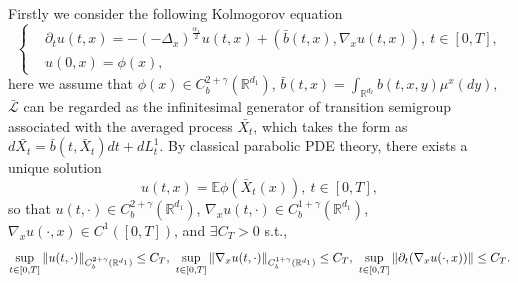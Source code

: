 \documentclass[11pt,reqno]{amsart}
\numberwithin{equation}{section}
\begin{document}
Firstly we consider the following Kolmogorov equation
\begin{equation}\label{6.10}
	\left\{
	\begin{aligned}
		&\partial_{t}u(t,x)=	-(-\Delta_{x})^{\frac{\alpha_{1}}{2}}u(t,x)+( \bar{b}(t,x),\nabla_{x}u(t,x)) ,\ t\in[0,T],\\
		&u(0,x)=\phi(x),
	\end{aligned}
	\right.
\end{equation}
here we assume that  $\phi(x)\in C^{2+\gamma}_{b}(\mathbb{R}^{d_{1}})$,  $ \bar{b}(t,x)=\int_{\mathbb{R}^{d_{2}}}b(t,x,y)\mu^{x}(dy),$ $\mathcal{\bar{L}}$ can be regarded as the infinitesimal generator of transition semigroup associated with the averaged process $\bar{X_{t}}$, which takes the form as $d\bar{X_{t}}=\bar{b}(t,\bar{X}_{t})dt+dL_{t}^{1}$. By classical parabolic PDE theory, there exists a unique solution 
\begin{equation}\label{6.11}
 u(t,x)=\mathbb{E}\phi(\bar{X}_{t}(x)),\ t\in[0,T],
\end{equation}
so that $u(t,\cdot)\in C_{b}^{2+\gamma}(\mathbb{R}^{d_{1}})$, $\nabla_{x}u(t,\cdot)\in C_{b}^{1+\gamma}(\mathbb{R}^{d_{1}})$, $\nabla_{x}u(\cdot,x)\in C^{1}([0,T])$, and $\exists C_{T}>0$ s.t.,
\begin{equation}\label{6.12}
 \sup_{t\in [0,T]}\Arrowvert u(t,\cdot)\Arrowvert_{C_{b}^{2+\gamma}(\mathbb{R}^{d_{1}})}\leq C_{T},\  \sup_{t\in [0,T]}\Arrowvert \nabla_{x}u(t,\cdot)\Arrowvert_{C_{b}^{1+\gamma}(\mathbb{R}^{d_{1}})}\leq C_{T},\  \sup_{t\in [0,T]}\Arrowvert \partial_{t}(\nabla_{x}u(\cdot,x))\Arrowvert\leq C_{T}.
\end{equation}
\end{document}
